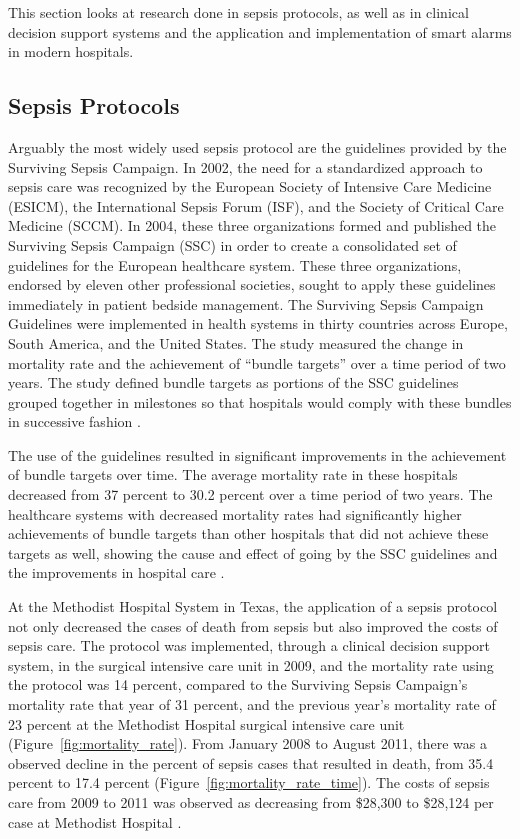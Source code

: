 \documentclass{sig-alternate}
\begin{document}
This section looks at research done in sepsis protocols, as well as in clinical decision support systems and the application and implementation of smart alarms in modern hospitals.

\vspace{10pt}
\subsection{Sepsis Protocols}
\label{subsec:protocols}
\vspace{10pt}

Arguably the most widely used sepsis protocol are the guidelines provided by the Surviving Sepsis Campaign. In 2002, the need for a standardized approach to sepsis care was recognized by the European Society of Intensive Care Medicine (ESICM), the International Sepsis Forum (ISF), and the Society of Critical Care Medicine (SCCM). In 2004, these three organizations formed and published the Surviving Sepsis Campaign (SSC) in order to create a consolidated set of guidelines for the European healthcare system. These three organizations, endorsed by eleven other professional societies, sought to apply these guidelines immediately in patient bedside management. The Surviving Sepsis Campaign Guidelines were implemented in health systems in thirty countries across Europe, South America, and the United States. The study measured the change in mortality rate and the achievement of ``bundle targets'' over a time period of two years. The study defined bundle targets as portions of the SSC guidelines grouped together in milestones so that hospitals would comply with these bundles in successive fashion \cite{ssc}. 

The use of the guidelines resulted in significant improvements in the achievement of bundle targets over time. The average mortality rate in these hospitals decreased from 37 percent to 30.2 percent over a time period of two years. The healthcare systems with decreased mortality rates had significantly higher achievements of bundle targets than other hospitals that did not achieve these targets as well, showing the cause and effect of going by the SSC guidelines and the improvements in hospital care \cite{ssc}.

At the Methodist Hospital System in Texas, the application of a sepsis protocol not only decreased the cases of death from sepsis but also improved the costs of sepsis care. The protocol was implemented, through a clinical decision support system, in the surgical intensive care unit in 2009, and the mortality rate using the protocol was 14 percent, compared to the Surviving Sepsis Campaign's mortality rate that year of 31 percent, and the previous year's mortality rate of 23 percent at the Methodist Hospital surgical intensive care unit (Figure~\ref{fig:mortality_rate}). From January 2008 to August 2011, there was a observed decline in the percent of sepsis cases that resulted in death, from 35.4 percent to 17.4 percent (Figure~\ref{fig:mortality_rate_time}). The costs of sepsis care from 2009 to 2011 was observed as decreasing from \$28,300 to \$28,124 per case at Methodist Hospital \cite{methodist}.
\end{document}
